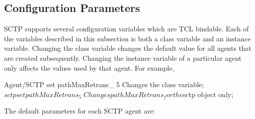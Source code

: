       \subsection{Configuration Parameters}
      \label{sec:sctpConfig}

	 SCTP supports several configuration variables which are TCL
	 bindable. Each of the variables described in this subsection is
	 both a class variable and an instance variable.  Changing the
	 class variable changes the default value for all agents that are
	 created subsequently.  Changing the instance variable of a
	 particular agent only affects the values used by that agent.  For
	 example,

	 \begin{program}
	 Agent/SCTP set pathMaxRetrans_ 5 \; Changes the class variable; 
	 $sctp set pathMaxRetrans_ 5 \; Changes pathMaxRetrans_ for the $sctp object only; 
         \end{program}

	 The default parameters for each SCTP agent are:

